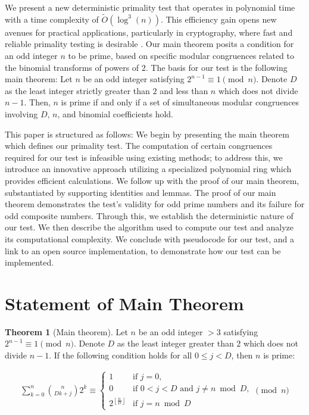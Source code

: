 \documentclass{article}
\theoremstyle{plain}
\theoremstyle{definition}
\newtheorem{theorem}{Theorem}
\newcommand{\floor}[1]{\left\lfloor #1 \right\rfloor}
\begin{document}
We present a new deterministic primality test that operates in polynomial time with a time complexity of $\tilde{O}(\log^3(n))$. This efficiency gain opens new avenues for practical applications, particularly in cryptography, where fast and reliable primality testing is desirable \cite{pomerance1984}. Our main theorem posits a condition for an odd integer \( n \) to be prime, based on specific modular congruences related to the binomial transforms of powers of $2$. The basis for our test is the following main theorem: Let \( n \) be an odd integer satisfying \( 2^{n-1} \equiv 1 \pmod{n} \). Denote \( D \) as the least integer strictly greater than \( 2 \) and less than \( n \) which does not divide \( n-1 \). Then, \( n \) is prime if and only if a set of simultaneous modular congruences involving \( D \), \( n \), and binomial coefficients hold.

This paper is structured as follows: We begin by presenting the main theorem which defines our primality test. The computation of certain congruences required for our test is infeasible using existing methods; to address this, we introduce an innovative approach utilizing a specialized polynomial ring which provides efficient calculations. We follow up with the proof of our main theorem, substantiated by supporting identities and lemmas. The proof of our main theorem demonstrates the test's validity for odd prime numbers and its failure for odd composite numbers. Through this, we establish the deterministic nature of our test. We then describe the algorithm used to compute our test and analyze its computational complexity. We conclude with pseudocode for our test, and a link to an open source implementation, to demonstrate how our test can be implemented.

\section{Statement of Main Theorem}
\begin{theorem}[Main theorem]
\label{theorem:main}
Let $n$ be an odd integer $> 3$ satisfying $2^{n-1} \equiv 1 \pmod{n}$. Denote $D$ as the least integer greater than $2$ which does not divide $n-1$. If the following condition holds for all $0 \leq j < D$, then $n$ is prime:

\begin{align}
    \sum_{k=0}^{n} \binom{n}{Dk + j} 2^k
    \equiv
    \begin{cases} 
        1 & \text{if } j=0, \\
        0 & \text{if } 0 < j < D \text{ and } j \neq n \bmod{D}, \\
        2^{\floor{\frac{n}{D}}} & \text{if } j = n \bmod{D}
    \end{cases}
    \pmod{n}
\end{align}
\end{theorem}
\end{document}
